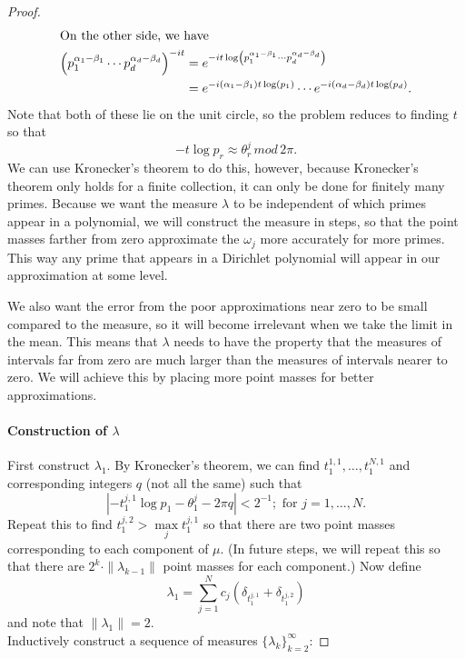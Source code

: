 \documentclass[]{elsarticle}
\numberwithin{equation}{section}
\begin{document}
\begin{proof}
\begin{align*}
            \intertext{On the other side, we have}
            \left(p_1^{\alpha_1-\beta_1}\dotsm p_d^{\alpha_d-\beta_d}\right)^{-it} 
              &= e^{-it \log \left(p_1^{\alpha_1-\beta_1}\dotsm p_d^{\alpha_d-\beta_d}\right)}\\
              &= e^{-i(\alpha_1-\beta_1)t\log(p_1)} \dotsm e^{-i(\alpha_d-\beta_d)t\log(p_d)}.
          \end{align*}
        Note that both of these lie on the unit circle, so the problem reduces to finding $t$ so that $$-t \log p_r \approx \theta_r^j \, mod\, 2\pi.$$ We can use Kronecker's theorem to do this, however, because Kronecker's theorem only holds for a finite collection, it can only be done for finitely many primes. Because we want the measure $\lambda$ to be independent of which primes appear in a polynomial, we will construct the measure in steps, so that the point masses farther from zero approximate the $\omega_j$ more accurately for more primes. This way any prime that appears in a Dirichlet polynomial will appear in our approximation at some level. 

        We also want the error from the poor approximations near zero to be small compared to the measure, so it will become irrelevant when we take the limit in the mean. This means that $\lambda$ needs to have the property that the measures of intervals far from zero are much larger than the measures of intervals nearer to zero.  We will achieve this by placing more point masses for better approximations.

        \paragraph{Construction of $\lambda$}
          First construct $\lambda_1$. By Kronecker's theorem, we can find $t_1^{1,1},\dots,t_1^{N,1}$ and corresponding integers $q$ (not all the same) such that 
            $$|-t_1^{j,1}\log p_1 -\theta_1^j  -2\pi q|<2^{-1}; \text{ for } j=1,\dots,N.$$
          Repeat this to find $t_1^{j,2}>\max\limits_j t_1^{j,1}$ so that there are two point masses corresponding to each component of $\mu$. (In future steps, we will repeat this so that there are $2^k\cdot\|\lambda_{k-1}\|$ point masses for each component.) Now define
            $$ \lambda_1 = \sum_{j=1}^{N}c_j \left(\delta_{t_1^{j,1}} + \delta_{t_1^{j,2}}\right) $$
          and note that $\|\lambda_1\| = 2$.\\
          Inductively construct a sequence of measures $\{\lambda_k\}_{k=2}^\infty$:


\end{proof}
\end{document}
